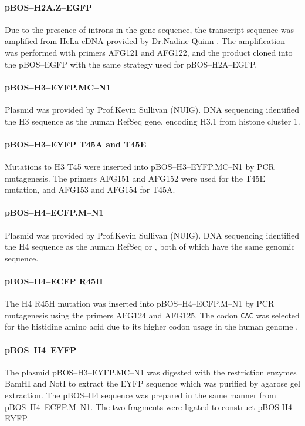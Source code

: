      \paragraph{pBOS--H2A.Z--EGFP}
      Due to the presence of introns in the  gene
      sequence, the transcript sequence was amplified from HeLa cDNA
      provided by Dr.\@ Nadine Quinn \citep{NadineThesis}.  The
      amplification was performed with primers AFG121 and AFG122, and
      the product cloned into the pBOS--EGFP with the same strategy
      used for pBOS--H2A--EGFP.

      \paragraph{pBOS--H3--EYFP.MC--N1}
      Plasmid was provided by Prof.\@ Kevin Sullivan (NUIG).  DNA
      sequencing identified the H3 sequence as the human RefSeq
       gene, encoding H3.1 from histone cluster 1.

      \paragraph{pBOS--H3--EYFP T45A and T45E}
      Mutations to H3 T45 were inserted into pBOS--H3--EYFP.MC--N1 by
      PCR mutagenesis. The primers AFG151 and AFG152 were used for the
      T45E mutation, and AFG153 and AFG154 for T45A.

      \paragraph{pBOS--H4--ECFP.M--N1}
      Plasmid was provided by Prof.\@ Kevin Sullivan (NUIG).  DNA
      sequencing identified the H4 sequence as the human RefSeq
       or , both of which have the same
      genomic sequence.

      \paragraph{pBOS--H4--ECFP R45H}
      The H4 R45H mutation was inserted into pBOS--H4--ECFP.M--N1 by
      PCR mutagenesis using the primers AFG124 and AFG125. The codon
      \texttt{CAC} was selected for the histidine amino acid due to
      its higher codon usage in the human genome \citep{codon_usage}.

      \paragraph{pBOS--H4--EYFP}
      The plasmid pBOS--H3--EYFP.MC--N1 was digested with the
      restriction enzymes BamHI and NotI to extract the EYFP sequence
      which was purified by agarose gel extraction.  The pBOS--H4
      sequence was prepared in the same manner from
      pBOS--H4--ECFP.M--N1.  The two fragments were ligated to
      construct pBOS-H4-EYFP.

